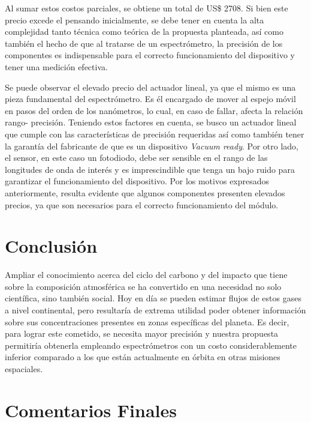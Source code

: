 \documentclass[11pt,titlepage]{article}
\begin{document}
Al sumar estos costos parciales, se obtiene un total de US\$ 2708. Si bien este precio excede el
pensando inicialmente, se debe tener en cuenta la alta complejidad tanto técnica como teórica de la propuesta planteada, así como también el hecho de que al tratarse de un espectrómetro, la precisión de los componentes es indispensable para el correcto funcionamiento del dispositivo y tener una medición efectiva.
\\\par
Se puede observar el elevado precio del actuador lineal, ya que el mismo es una pieza fundamental del espectrómetro. Es él encargado de mover al espejo móvil en pasos del orden de los nanómetros, lo cual, en caso de fallar, afecta la relación rango- precisión. Teniendo estos factores en cuenta, se busco un actuador lineal que cumple con las características de precisión requeridas así como también tener la garantía del fabricante de que es un dispositivo \textit{Vacuum ready}. Por otro lado, el sensor, en este caso un fotodiodo, debe ser sensible en el rango de las longitudes de onda de interés y es imprescindible que tenga un bajo ruido para garantizar el funcionamiento del dispositivo. Por los motivos expresados anteriormente, resulta evidente que algunos componentes presenten elevados precios, ya que son necesarios para el correcto funcionamiento del módulo.


\section{Conclusión}

Ampliar el conocimiento acerca del ciclo del carbono y del impacto que tiene sobre la composición atmosférica se ha convertido en una necesidad no solo científica, sino también social. Hoy en día se pueden estimar flujos de estos gases a nivel continental, pero resultaría de extrema utilidad poder obtener información sobre sus concentraciones presentes en zonas específicas del planeta. Es decir, para lograr este cometido, se necesita mayor precisión y nuestra propuesta permitiría obtenerla empleando espectrómetros con un costo considerablemente inferior comparado a los que están actualmente en órbita en otras misiones espaciales.\par

\section{Comentarios Finales}
\end{document}
